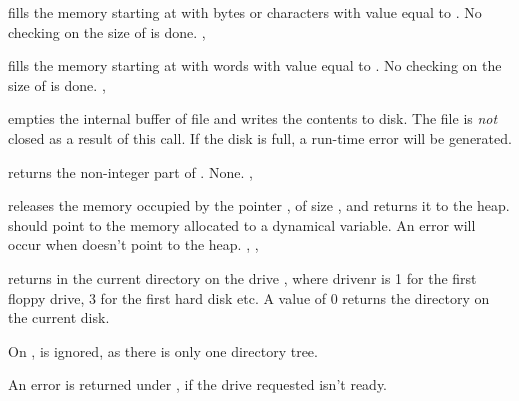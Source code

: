 \documentclass{report}
\begin{document}
\html{}

{ fills the memory starting at  with  bytes
or characters with value equal to .
}
{No checking on the size of  is done.}
{, }

\html{}

{ fills the memory starting at  with  words
with value equal to .
}
{No checking on the size of  is done.}
{, }

\html{}

{ empties the internal buffer of file  and writes the
contents to disk. The file is \textit{not} closed as a result of this call.}
{If the disk is full, a run-time error will be generated.}
{}

\html{}

{ returns the non-integer part of .}
{None.}
{, }

\html{}

{ releases the memory occupied by the pointer , of size
, and returns it to the heap.  should point to the memory
allocated to a dynamical variable.}
{An error will occur when  doesn't point to the heap.}
{, , }

\html{}

{ returns in  the current directory on the drive
, where {drivenr} is 1 for the first floppy drive, 3 for the
first hard disk etc. A value of 0 returns the directory on the current disk.

On \linux,  is ignored, as there is only one directory tree.}
{An error is returned under \dos, if the drive requested isn't ready.}
{}
\end{document}
